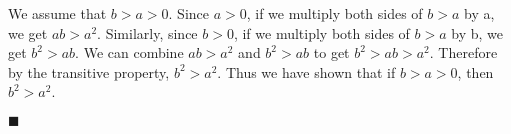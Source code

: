 \documentclass[12pt]{article}
\renewcommand{\qed}{\hfill$\blacksquare$}
\renewenvironment{proof}{\begin{addmargin}[1em]{0em}\begin{newproof}}{\end{newproof}\end{addmargin}\qed}
\begin{document}
\begin{proof}[Proof]
We assume that $b > a > 0$. Since $a > 0$, if we multiply both sides of $b > a$ by a, we get $ab > a^{2}$. Similarly, since $b > 0$, if we multiply both sides of $b > a$ by b, we get $b^{2} > ab$. We can combine $ab > a^{2}$ and $b^{2} > ab$ to get $b^{2} > ab > a^{2}$. Therefore by the transitive property, $b^{2} > a^{2}$. Thus we have shown that if $b > a > 0$, then $b^{2} > a^{2}$.

\end{proof}


\end{document}
